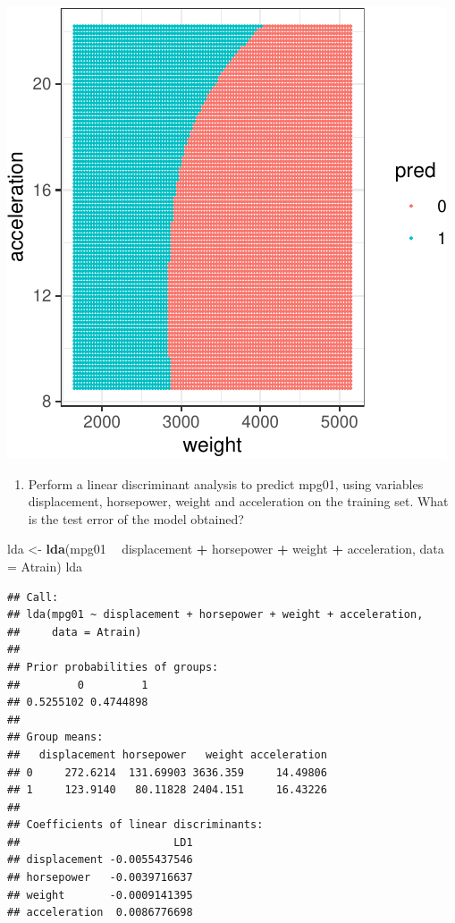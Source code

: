 \documentclass[]{article}
\newenvironment{Shaded}{\begin{snugshade}}{\end{snugshade}}
\newcommand{\DataTypeTok}[1]{\textcolor[rgb]{0.13,0.29,0.53}{#1}}
\newcommand{\KeywordTok}[1]{\textcolor[rgb]{0.13,0.29,0.53}{\textbf{#1}}}
\newcommand{\NormalTok}[1]{#1}
\newcommand{\OperatorTok}[1]{\textcolor[rgb]{0.81,0.36,0.00}{\textbf{#1}}}
\newcommand{\StringTok}[1]{\textcolor[rgb]{0.31,0.60,0.02}{#1}}
\providecommand{\tightlist}{%
  \setlength{\itemsep}{0pt}\setlength{\parskip}{0pt}}
\begin{document}
\begin{center}\includegraphics{sol_A3_files/figure-latex/unnamed-chunk-12-1} \end{center}

\begin{enumerate}
\def\labelenumi{(\alph{enumi})}
\setcounter{enumi}{3}
\tightlist
\item
  Perform a linear discriminant analysis to predict mpg01, using
  variables displacement, horsepower, weight and acceleration on the
  training set. What is the test error of the model obtained?
\end{enumerate}

\begin{Shaded}
\begin{Highlighting}[]
\NormalTok{lda <-}\StringTok{ }\KeywordTok{lda}\NormalTok{(mpg01 }\OperatorTok{~}\StringTok{ }\NormalTok{displacement }\OperatorTok{+}\StringTok{ }\NormalTok{horsepower }\OperatorTok{+}\StringTok{ }
\StringTok{           }\NormalTok{weight }\OperatorTok{+}\StringTok{ }\NormalTok{acceleration, }\DataTypeTok{data =}\NormalTok{ Atrain)}
\NormalTok{lda}
\end{Highlighting}
\end{Shaded}

\begin{verbatim}
## Call:
## lda(mpg01 ~ displacement + horsepower + weight + acceleration, 
##     data = Atrain)
## 
## Prior probabilities of groups:
##         0         1 
## 0.5255102 0.4744898 
## 
## Group means:
##   displacement horsepower   weight acceleration
## 0     272.6214  131.69903 3636.359     14.49806
## 1     123.9140   80.11828 2404.151     16.43226
## 
## Coefficients of linear discriminants:
##                        LD1
## displacement -0.0055437546
## horsepower   -0.0039716637
## weight       -0.0009141395
## acceleration  0.0086776698
\end{verbatim}
\end{document}
